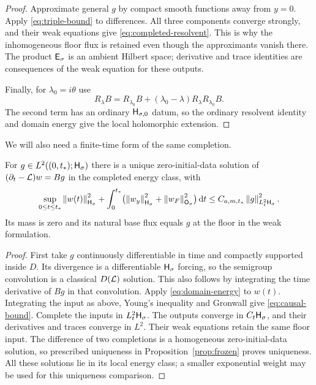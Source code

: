 \begin{proof}
Approximate general $g$ by compact smooth functions away from $y=0$.
Apply \eqref{eq:triple-bound} to differences. All three components
converge strongly, and their weak equations give
\eqref{eq:completed-resolvent}. This is why the inhomogeneous floor flux
is retained even though the approximants vanish there. The product
$\mathsf E_\sigma$ is an ambient Hilbert space; derivative and trace identities
are consequences of the weak equation for these outputs.

Finally, for $\lambda_0=i\theta$ use
\[
 R_\lambda B=R_{\lambda_0}B+
       (\lambda_0-\lambda)R_\lambda R_{\lambda_0}B.
\]
The second term has an ordinary $\mathsf H_{\sigma,0}$ datum, so the ordinary
resolvent identity and domain energy give the local holomorphic extension.
\end{proof}

We will also need a finite-time form of the same completion.

\begin{lemma}\label{lem:causal}
For $g\in L^2((0,t_*);\mathsf H_\sigma)$ there is a unique zero-initial-data
solution of $(\partial_t-\mathcal L)w=Bg$ in the completed energy class, with
\begin{equation}\label{eq:causal-bound}
 \sup_{0\le t\le t_*}\left\|w(t)\right\|_{\mathsf H_\sigma}^2+
 \int_0^{t_*}\bigl(\left\|w_y\right\|_{\mathsf H_\sigma}^2+
                  \left\|w_F\right\|_{\mathsf O_\sigma}^2\bigr)\,\mathrm d t
 \le C_{a,m,t_*}\left\|g\right\|_{L^2_t\mathsf H_\sigma}^2.
\end{equation}
Its mass is zero and its natural base flux equals $g$ at the floor in
the weak formulation.
\end{lemma}

\begin{proof}
First take $g$ continuously differentiable in time and compactly supported
inside $D$. Its divergence is a differentiable $\mathsf H_\sigma$ forcing, so
the semigroup convolution is a classical $D(\mathcal L)$ solution. This also
follows by integrating the time derivative of $Bg$ in that convolution.
Apply \eqref{eq:domain-energy} to $w(t)$. Integrating the input as above,
Young's inequality and Gronwall give \eqref{eq:causal-bound}.
Complete the inputs in $L^2_t\mathsf H_\sigma$. The outputs converge in
$C_t\mathsf H_\sigma$, and their derivatives and traces converge in $L^2$.
Their weak equations retain the same floor input. The difference of two
completions is a homogeneous zero-initial-data solution, so prescribed
uniqueness in Proposition~\ref{prop:frozen} proves uniqueness. All these
solutions lie in its local energy class; a smaller exponential weight
may be used for this uniqueness comparison.
\end{proof}
